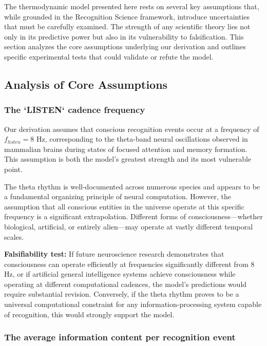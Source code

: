 \documentclass[12pt, aip, jcp]{revtex4-2} %
\begin{document}
The thermodynamic model presented here rests on several key assumptions that, while grounded in the Recognition Science framework, introduce uncertainties that must be carefully examined. The strength of any scientific theory lies not only in its predictive power but also in its vulnerability to falsification. This section analyzes the core assumptions underlying our derivation and outlines specific experimental tests that could validate or refute the model.

\subsection{Analysis of Core Assumptions}

\subsubsection{The `LISTEN` cadence frequency}

Our derivation assumes that conscious recognition events occur at a frequency of \(f_{listen} = 8 \text{ Hz}\), corresponding to the theta-band neural oscillations observed in mammalian brains during states of focused attention and memory formation. This assumption is both the model's greatest strength and its most vulnerable point.

The theta rhythm is well-documented across numerous species and appears to be a fundamental organizing principle of neural computation. However, the assumption that all conscious entities in the universe operate at this specific frequency is a significant extrapolation. Different forms of consciousness—whether biological, artificial, or entirely alien—may operate at vastly different temporal scales.

\textbf{Falsifiability test:} If future neuroscience research demonstrates that consciousness can operate efficiently at frequencies significantly different from 8 Hz, or if artificial general intelligence systems achieve consciousness while operating at different computational cadences, the model's predictions would require substantial revision. Conversely, if the theta rhythm proves to be a universal computational constraint for any information-processing system capable of recognition, this would strongly support the model.

\subsubsection{The average information content per recognition event}
\end{document}
